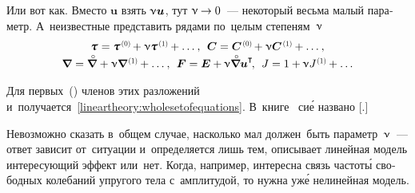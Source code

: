 \begin{otherlanguage}{russian}
Или вот как. Вместо $\bm{u}$ взять $\upnu \bm{u}$, тут ${\upnu \hspace{-0.1ex}\to 0}$~--- некоторый весьма малый параметр. А~неизвестные представить рядами по~целым степеням~$\upnu$
\vspace{0.1em}\[\begin{array}{c}
\mathboldtau \hspace{0.1ex} = \mathboldtau^{\hspace{0.2ex}\scalebox{0.66}[0.66]{(0)}} \hspace{-0.2ex} + \smallparameter \mathboldtau^{\hspace{0.2ex}\scalebox{0.66}[0.66]{(1)}} \hspace{-0.1ex} + \ldots \hspace{0.1ex}, \:\:
\bm{C} = \bm{C}^{\hspace{0.2ex}\scalebox{0.66}[0.66]{(0)}} \hspace{-0.2ex} + \smallparameter \bm{C}^{\hspace{0.2ex}\scalebox{0.66}[0.66]{(1)}} \hspace{-0.1ex} + \ldots \hspace{0.1ex}, \\[0.1em]
\boldnabla \hspace{0.1ex} = \boldnablacircled \hspace{0.1ex} + \smallparameter \boldnabla^{\hspace{0.2ex}\scalebox{0.66}[0.66]{(1)}} \hspace{-0.1ex} + \ldots \hspace{0.1ex} , \:\:
\bm{F} = \bm{E} + \hspace{-0.1ex} \smallparameter \boldnablacircled {\bm{u}}^{\T} \hspace{-0.3ex}, \:\:
J = 1 + \hspace{-0.1ex} \smallparameter J^{\hspace{0.1ex}\scalebox{0.66}[0.66]{(1)}} \hspace{-0.1ex} + \ldots
\end{array}\]

\noindent Для первых~() членов этих разложений и~получается~\eqref{lineartheory:wholesetofequations}. В~\hbox{книге~\cite{truesdell-firstcourse}} си\'{е} названо [.]

Невозможно сказать в~общем случае, насколько мал должен~быть параметр~$\upnu$~--- ответ зависит от~ситуации и~определяется лишь тем, описывает линейная модель интересующий эффект или~нет. Когда, например, интересна связь частот\'{ы} свободных колебаний упругого тела с~амплитудой, то нужна уж\'{е} нелинейная модель.


\end{otherlanguage}
